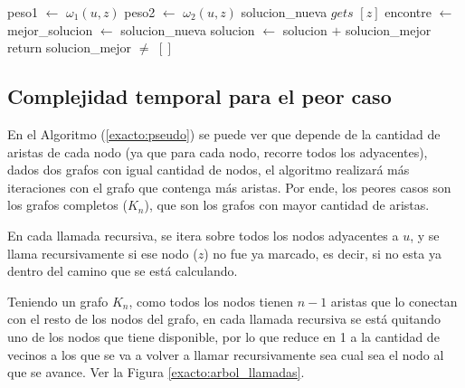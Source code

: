 \begin{algorithmic}[1]
		\State {}
			\State peso1 $\gets$ $\omega_1({u, z})$
			\State peso2 $\gets$ $\omega_2({u, z})$
				\State {}
				\State solucion\_nueva $gets$ $[z]$
				\State encontre $\gets$ 
					\State mejor\_solucion $\gets$ solucion\_nueva
				\EndIf
				\State {}
			\EndIf
		\EndIf
		\EndFor
		\State {}
			\State solucion $\gets$ solucion $+$ solucion\_mejor
		\EndIf
		\State return solucion\_mejor $\neq$ $[]$
	\EndProcedure
\end{algorithmic}

\subsection{Complejidad temporal para el peor caso} \label{exacto:complejidad}

En el Algoritmo (\ref{exacto:pseudo}) se puede ver que depende de la cantidad de aristas de cada nodo (ya que para cada nodo, recorre todos los adyacentes), dados dos grafos
con igual cantidad de nodos, el algoritmo realizar\'a m\'as iteraciones con el grafo que contenga m\'as aristas. Por ende, los peores casos son los grafos completos ($K_n$),
que son los grafos con mayor cantidad de aristas.

En cada llamada recursiva, se itera sobre todos los nodos adyacentes a $u$, y se llama recursivamente si ese nodo ($z$) no fue ya marcado, es decir, si no esta ya dentro del camino que se est\'a calculando.

Teniendo un grafo $K_n$, como todos los nodos tienen $n - 1$ aristas que lo conectan con el resto de los nodos del grafo, en cada llamada recursiva se est\'a quitando uno de los nodos que tiene disponible, por lo que reduce en 1 a la cantidad de vecinos a los que se va a volver a llamar recursivamente sea cual sea el nodo al que se avance. Ver la Figura \ref{exacto:arbol_llamadas}.

